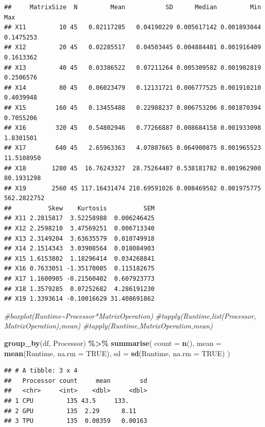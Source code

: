 \documentclass[
]{article}
\newenvironment{Shaded}{\begin{snugshade}}{\end{snugshade}}
\newcommand{\CommentTok}[1]{\textcolor[rgb]{0.56,0.35,0.01}{\textit{#1}}}
\newcommand{\DataTypeTok}[1]{\textcolor[rgb]{0.13,0.29,0.53}{#1}}
\newcommand{\KeywordTok}[1]{\textcolor[rgb]{0.13,0.29,0.53}{\textbf{#1}}}
\newcommand{\NormalTok}[1]{#1}
\newcommand{\OperatorTok}[1]{\textcolor[rgb]{0.81,0.36,0.00}{\textbf{#1}}}
\newcommand{\OtherTok}[1]{\textcolor[rgb]{0.56,0.35,0.01}{#1}}
\newcommand{\StringTok}[1]{\textcolor[rgb]{0.31,0.60,0.02}{#1}}
\begin{document}
\begin{verbatim}
##     MatrixSize  N         Mean           SD      Median         Min         Max
## X11         10 45   0.02117285   0.04190229 0.005617142 0.001893044   0.1475253
## X12         20 45   0.02285517   0.04503445 0.004884481 0.001916409   0.1613362
## X13         40 45   0.03386522   0.07211264 0.005309582 0.001902819   0.2506576
## X14         80 45   0.06023479   0.12131721 0.006777525 0.001910210   0.4039948
## X15        160 45   0.13455488   0.22988237 0.006753206 0.001870394   0.7055206
## X16        320 45   0.54802946   0.77266887 0.008684158 0.001933098   1.8301501
## X17        640 45   2.65963363   4.07807665 0.064900875 0.001965523  11.5108950
## X18       1280 45  16.76243327  28.75264487 0.538181782 0.001962900  80.1931298
## X19       2560 45 117.16431474 210.69591026 0.008469582 0.001975775 562.2822752
##          Skew    Kurtosis          SEM
## X11 2.2815817  3.52258988  0.006246425
## X12 2.2598210  3.47569251  0.006713340
## X13 2.3149204  3.63635579  0.010749918
## X14 2.1514343  3.03908564  0.018084903
## X15 1.6153802  1.18296414  0.034268841
## X16 0.7633051 -1.35170085  0.115182675
## X17 1.1600905 -0.21560402  0.607923773
## X18 1.3579285  0.07252682  4.286191230
## X19 1.3393614 -0.10016629 31.408691862
\end{verbatim}

\begin{Shaded}
\begin{Highlighting}[]
\CommentTok{\#boxplot(Runtime\textasciitilde{}Processor*MatrixOperation)}
\CommentTok{\#tapply(Runtime,list(Processor, MatrixOperation),mean)}
\CommentTok{\#tapply(Runtime,MatrixOperation,mean)}

\KeywordTok{group\_by}\NormalTok{(df, Processor) }\OperatorTok{\%\textgreater{}\%}
\StringTok{  }\KeywordTok{summarise}\NormalTok{(}
    \DataTypeTok{count =} \KeywordTok{n}\NormalTok{(),}
    \DataTypeTok{mean =} \KeywordTok{mean}\NormalTok{(Runtime, }\DataTypeTok{na.rm =} \OtherTok{TRUE}\NormalTok{),}
    \DataTypeTok{sd =} \KeywordTok{sd}\NormalTok{(Runtime, }\DataTypeTok{na.rm =} \OtherTok{TRUE}\NormalTok{)}
\NormalTok{  )}
\end{Highlighting}
\end{Shaded}

\begin{verbatim}
## # A tibble: 3 x 4
##   Processor count     mean        sd
##   <chr>     <int>    <dbl>     <dbl>
## 1 CPU         135 43.5     133.     
## 2 GPU         135  2.29      8.11   
## 3 TPU         135  0.00359   0.00163
\end{verbatim}
\end{document}
